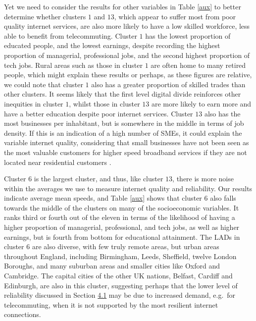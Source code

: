 \documentclass[Royal,times,sageh]{sagej}
\begin{document}
Yet we need to consider the results for other variables in Table
\ref{aux} to better determine whether clusters \(1\) and \(13\), which
appear to suffer most from poor quality internet services, are also more
likely to have a low skilled workforce, less able to benefit from
telecommuting. Cluster \(1\) has the lowest proportion of educated
people, and the lowest earnings, despite recording the highest
proportion of managerial, professional jobs, and the second highest
proportion of tech jobs. Rural areas such as those in cluster \(1\) are
often home to many retired people, which might explain these results or
perhaps, as these figures are relative, we could note that cluster \(1\)
also has a greater proportion of skilled trades than other clusters. It
seems likely that the first level digital divide reinforces other
inequities in cluster \(1\), whilst those in cluster \(13\) are more
likely to earn more and have a better education despite poor internet
services. Cluster \(13\) also has the most businesses per inhabitant,
but is somewhere in the middle in terms of job density. If this is an
indication of a high number of SMEs, it could explain the variable
internet quality, considering that small businesses have not been seen
as the most valuable customers for higher speed broadband services if
they are not located near residential customers \citep{ofcom2016}.

Cluster \(6\) is the largest cluster, and thus, like cluster \(13\),
there is more noise within the averages we use to measure internet
quality and reliability. Our results indicate average mean speeds, and
Table \ref{aux} shows that cluster \(6\) also falls towards the middle
of the clusters on many of the socioeconomic variables. It ranks third
or fourth out of the eleven in terms of the likelihood of having a
higher proportion of managerial, professional, and tech jobs, as well as
higher earnings, but is fourth from bottom for educational attainment.
The LADs in cluster \(6\) are also diverse, with few truly remote areas,
but urban areas throughout England, including Birmingham, Leeds,
Sheffield, twelve London Boroughs, and many suburban areas and smaller
cities like Oxford and Cambridge. The capital cities of the other UK
nations, Belfast, Cardiff and Edinburgh, are also in this cluster,
suggesting perhaps that the lower level of reliability discussed in
Section \protect\hyperlink{sec:4.1}{4.1} may be due to increased demand,
e.g.~for telecommuting, when it is not supported by the most resilient
internet connections.
\end{document}
